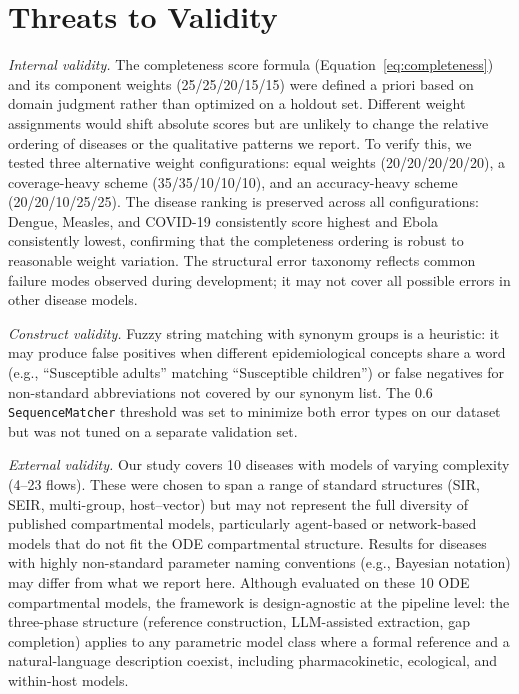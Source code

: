 \section{Threats to Validity}
\label{sec:threats}

\textit{Internal validity.}
The completeness score formula (Equation~\ref{eq:completeness}) and its component weights
(25/25/20/15/15) were defined a priori based on domain judgment rather than optimized on
a holdout set. Different weight assignments would shift absolute scores but are unlikely to
change the relative ordering of diseases or the qualitative patterns we report.
To verify this, we tested three alternative weight configurations: equal weights
(20/20/20/20/20), a coverage-heavy scheme (35/35/10/10/10), and an accuracy-heavy scheme
(20/20/10/25/25). The disease ranking is preserved across all configurations: Dengue,
Measles, and COVID-19 consistently score highest and Ebola consistently lowest,
confirming that the completeness ordering is robust to reasonable weight variation.
The structural error taxonomy reflects common failure modes observed during development; it may
not cover all possible errors in other disease models.

\textit{Construct validity.}
Fuzzy string matching with synonym groups is a heuristic: it may produce false positives
when different epidemiological concepts share a word (e.g., ``Susceptible adults'' matching
``Susceptible children'') or false negatives for non-standard abbreviations not covered by
our synonym list. The 0.6 \texttt{SequenceMatcher} threshold was set to minimize both error
types on our dataset but was not tuned on a separate validation set.

\textit{External validity.}
Our study covers 10 diseases with models of varying complexity (4--23 flows). These were
chosen to span a range of standard structures (SIR, SEIR, multi-group, host--vector) but
may not represent the full diversity of published compartmental models, particularly agent-based
or network-based models that do not fit the ODE compartmental structure. Results for
diseases with highly non-standard parameter naming conventions (e.g., Bayesian notation)
may differ from what we report here.
Although evaluated on these 10 ODE compartmental models, the framework is
design-agnostic at the pipeline level: the three-phase structure (reference construction,
LLM-assisted extraction, gap completion) applies to any parametric model class where a
formal reference and a natural-language description coexist, including pharmacokinetic,
ecological, and within-host models.

